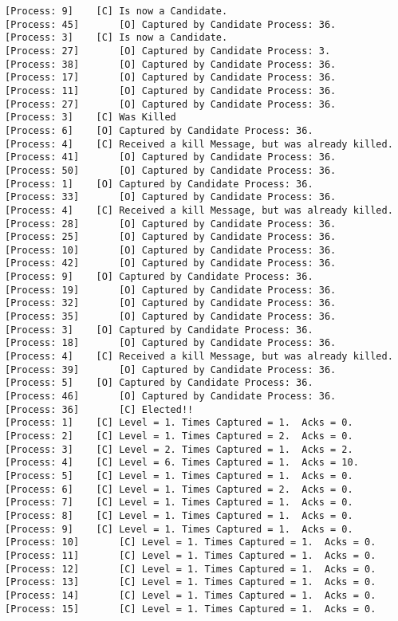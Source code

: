 \begin{Verbatim}[commandchars=\\\{\},codes={\catcode`$=3\catcode`_=8},frame=single,label=Test 6 output]
[Process: 9]	[C]	Is now a Candidate.
[Process: 45]       [O]	Captured by Candidate Process: 36.
[Process: 3]	[C]	Is now a Candidate.
[Process: 27]       [O]	Captured by Candidate Process: 3.
[Process: 38]       [O]	Captured by Candidate Process: 36.
[Process: 17]       [O]	Captured by Candidate Process: 36.
[Process: 11]       [O]	Captured by Candidate Process: 36.
[Process: 27]       [O]	Captured by Candidate Process: 36.
[Process: 3]	[C]	Was Killed
[Process: 6]	[O]	Captured by Candidate Process: 36.
[Process: 4]	[C]	Received a kill Message, but was already killed.
[Process: 41]       [O]	Captured by Candidate Process: 36.
[Process: 50]       [O]	Captured by Candidate Process: 36.
[Process: 1]	[O]	Captured by Candidate Process: 36.
[Process: 33]       [O]	Captured by Candidate Process: 36.
[Process: 4]	[C]	Received a kill Message, but was already killed.
[Process: 28]       [O]	Captured by Candidate Process: 36.
[Process: 25]       [O]	Captured by Candidate Process: 36.
[Process: 10]       [O]	Captured by Candidate Process: 36.
[Process: 42]       [O]	Captured by Candidate Process: 36.
[Process: 9]	[O]	Captured by Candidate Process: 36.
[Process: 19]       [O]	Captured by Candidate Process: 36.
[Process: 32]       [O]	Captured by Candidate Process: 36.
[Process: 35]       [O]	Captured by Candidate Process: 36.
[Process: 3]	[O]	Captured by Candidate Process: 36.
[Process: 18]       [O]	Captured by Candidate Process: 36.
[Process: 4]	[C]	Received a kill Message, but was already killed.
[Process: 39]       [O]	Captured by Candidate Process: 36.
[Process: 5]	[O]	Captured by Candidate Process: 36.
[Process: 46]       [O]	Captured by Candidate Process: 36.
[Process: 36]       [C]	Elected!! 
[Process: 1]	[C]	Level = 1. Times Captured = 1.	Acks = 0.
[Process: 2]	[C]	Level = 1. Times Captured = 2.	Acks = 0.
[Process: 3]	[C]	Level = 2. Times Captured = 1.	Acks = 2.
[Process: 4]	[C]	Level = 6. Times Captured = 1.	Acks = 10.
[Process: 5]	[C]	Level = 1. Times Captured = 1.	Acks = 0.
[Process: 6]	[C]	Level = 1. Times Captured = 2.	Acks = 0.
[Process: 7]	[C]	Level = 1. Times Captured = 1.	Acks = 0.
[Process: 8]	[C]	Level = 1. Times Captured = 1.	Acks = 0.
[Process: 9]	[C]	Level = 1. Times Captured = 1.	Acks = 0.
[Process: 10]       [C]	Level = 1. Times Captured = 1.	Acks = 0.
[Process: 11]       [C]	Level = 1. Times Captured = 1.	Acks = 0.
[Process: 12]       [C]	Level = 1. Times Captured = 1.	Acks = 0.
[Process: 13]       [C]	Level = 1. Times Captured = 1.	Acks = 0.
[Process: 14]       [C]	Level = 1. Times Captured = 1.	Acks = 0.
[Process: 15]       [C]	Level = 1. Times Captured = 1.	Acks = 0.

\end{Verbatim}
